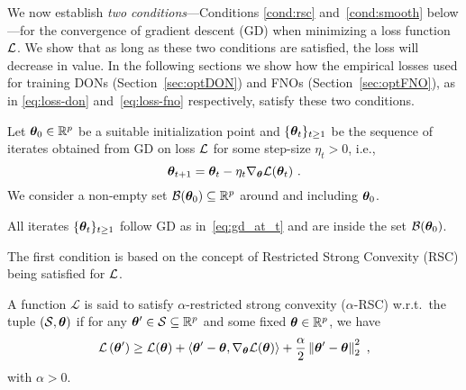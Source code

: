 We now establish {\em two conditions}---Conditions \ref{cond:rsc} and~\ref{cond:smooth} below---for the convergence of gradient descent (GD) when minimizing a 
loss function ${\cal L}$.
We show that as long as these two conditions are satisfied, the loss will decrease in value. 
In the following sections we show how the empirical losses used for training DONs (Section~\ref{sec:optDON}) and FNOs (Section~\ref{sec:optFNO}), as in \eqref{eq:loss-don} and~\eqref{eq:loss-fno} respectively, satisfy these two conditions. %
%
    
%

 Let ${\bm{\theta}}_0\in{\mathbb{R}}^p$ be a suitable initialization point and $\{{\bm{\theta}}_t\}_{t\geq 1}$ be the sequence of iterates obtained from GD on loss ${\cal L}$ for some step-size $\eta_t>0$, i.e.,
\begin{equation}
{\bm{\theta}}_{t+1} = {\bm{\theta}}_{t} - \eta_{t} \nabla_{{\bm{\theta}}} {\mathcal{L}}({\bm{\theta}}_t )~.
    \label{eq:gd_at_t}
\end{equation}
We consider a non-empty set ${\cal B}({\bm{\theta}}_0)\subseteq{\mathbb{R}}^p$ around and including ${\bm{\theta}}_0$. 

\begin{asmp}
\label{asmp:iter-0}
All iterates $\{{\bm{\theta}}_t\}_{t\geq 1}$ follow GD as in~\eqref{eq:gd_at_t} and are inside the set ${\cal B}({\bm{\theta}}_0)$.
\end{asmp}

The first condition is based on the concept of Restricted Strong Convexity (RSC) being satisfied for ${\cal L}$. %
\begin{defn} A function $\mathcal{L}$ is said to satisfy $\alpha$-restricted strong convexity ($\alpha$-RSC) w.r.t.~the tuple $(\mathcal{S}, {\bm{\theta}})$ if for any ${\bm{\theta}}^{\prime} \in \mathcal{S} \subseteq \mathbb{R}^p$ and some fixed ${\bm{\theta}} \in \mathbb{R}^p$, we have 
\begin{align}
\label{eq:RSC-prim}
\mathcal{L}\left({\bm{\theta}}^{\prime}\right) \geq \mathcal{L}({\bm{\theta}}) + \left\langle{\bm{\theta}}^{\prime}-{\bm{\theta}}, \nabla_{\bm{\theta}} \mathcal{L}({\bm{\theta}})\right\rangle+\frac{\alpha}{2}\left\|{\bm{\theta}}^{\prime}-{\bm{\theta}}\right\|_2^2~, 
\end{align}
with $\alpha>0$.
\end{defn}
%
%
%

